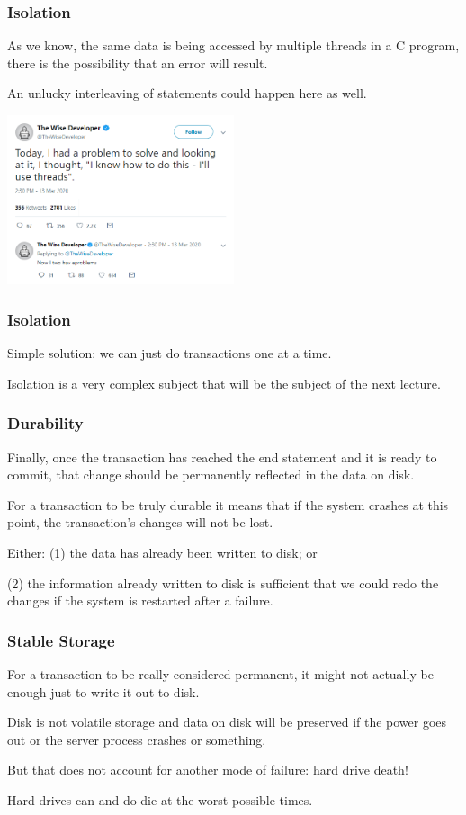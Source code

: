 \begin{frame}
\frametitle{Isolation}

As we know, the same data is being accessed by multiple threads in a C program, there is the possibility that an error will result. 

An unlucky interleaving of statements could happen here as well. 

\begin{center}
	\includegraphics[width=0.5\textwidth]{images/twoproblems.png}
\end{center}

\end{frame}

\begin{frame}
\frametitle{Isolation}


Simple solution: we can just do transactions one at a time. 

Isolation is a very complex subject that will be the subject of the next lecture.

\end{frame}

\begin{frame}
\frametitle{Durability}
Finally, once the transaction has reached the end statement and it is ready to commit, that change should be permanently reflected in the data on disk. 

For a transaction to be truly durable it means that if the system crashes at this point, the transaction's changes will not be lost. 

Either: (1) the data has already been written to disk; or 

(2) the information already written to disk is sufficient that we could redo the changes if the system is restarted after a failure.


\end{frame}

\begin{frame}
\frametitle{Stable Storage}

For a transaction to be really considered permanent, it might not actually be enough just to write it out to disk. 

Disk is not volatile storage and data on disk will be preserved if the power goes out or the server process crashes or something. 

But that does not account for another mode of failure: hard drive death! 

Hard drives can and do die at the worst possible times.


\end{frame}



